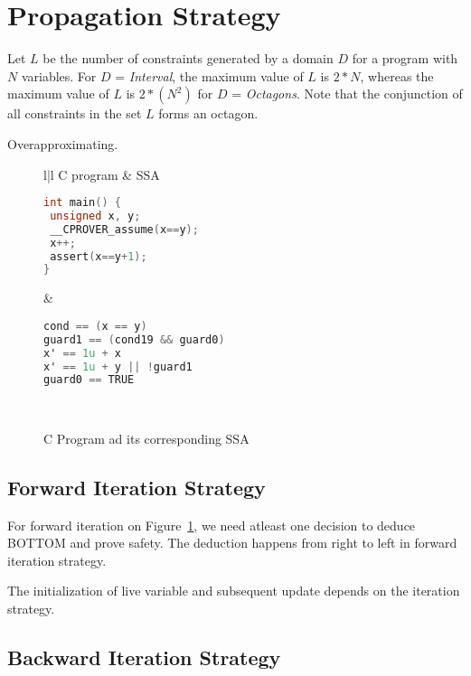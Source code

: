 \section{Propagation Strategy}
Let $L$ be the number of constraints generated by a domain $D$
for a program with $N$ variables. For $D$ = {\em Interval}, the 
maximum value of $L$ is $2*N$, whereas the maximum value of $L$ is 
$2*(N^2)$ for $D$ = {\em Octagons}. Note that the conjunction of all 
constraints in the set $L$ forms an octagon.

Overapproximating.


\begin{figure}[t]
\scriptsize
\begin{tabular}{l|l}
\hline
C program & SSA \\
\hline
\begin{lstlisting}[mathescape=true,language=C]
int main() {
 unsigned x, y;
 __CPROVER_assume(x==y);
 x++;
 assert(x==y+1);
}
\end{lstlisting}
&
\begin{lstlisting}[mathescape=true,language=C]
cond == (x == y)
guard1 == (cond19 && guard0)
x' == 1u + x
x' == 1u + y || !guard1
guard0 == TRUE
\end{lstlisting}
\\
\hline
\end{tabular}
\caption{C Program ad its corresponding SSA}
\label{swssa}
\end{figure}

\subsection{Forward Iteration Strategy}
For forward iteration on Figure~\ref{swssa}, we need atleast 
one decision to deduce BOTTOM and prove safety. The deduction 
happens from right to left in forward iteration strategy.

The initialization of live variable and subsequent update depends on the iteration strategy.

\subsection{Backward Iteration Strategy}

